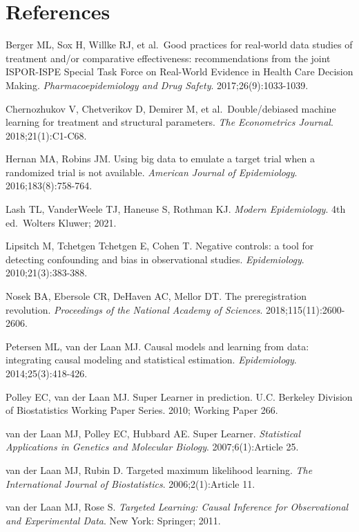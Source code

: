 \documentclass[
  letterpaper,
  DIV=11,
  numbers=noendperiod]{scrartcl}
\newlength{\cslhangindent}
\newenvironment{CSLReferences}[2] %
 {\begin{list}{}{%
  \setlength{\itemindent}{0pt}
  \setlength{\leftmargin}{0pt}
  \setlength{\parsep}{0pt}
  \ifodd #1
   \setlength{\leftmargin}{\cslhangindent}
   \setlength{\itemindent}{-1\cslhangindent}
  \fi
  \setlength{\itemsep}{#2\baselineskip}}}
 {\end{list}}
\begin{document}
\section{References}\label{references}

\label{refs}
\begin{CSLReferences}{0}{1}
\end{CSLReferences}

Berger ML, Sox H, Willke RJ, et al.~Good practices for real-world data
studies of treatment and/or comparative effectiveness: recommendations
from the joint ISPOR-ISPE Special Task Force on Real-World Evidence in
Health Care Decision Making. \emph{Pharmacoepidemiology and Drug
Safety}. 2017;26(9):1033-1039.

Chernozhukov V, Chetverikov D, Demirer M, et al.~Double/debiased machine
learning for treatment and structural parameters. \emph{The Econometrics
Journal}. 2018;21(1):C1-C68.

Hernan MA, Robins JM. Using big data to emulate a target trial when a
randomized trial is not available. \emph{American Journal of
Epidemiology}. 2016;183(8):758-764.

Lash TL, VanderWeele TJ, Haneuse S, Rothman KJ. \emph{Modern
Epidemiology}. 4th ed.~Wolters Kluwer; 2021.

Lipsitch M, Tchetgen Tchetgen E, Cohen T. Negative controls: a tool for
detecting confounding and bias in observational studies.
\emph{Epidemiology}. 2010;21(3):383-388.

Nosek BA, Ebersole CR, DeHaven AC, Mellor DT. The preregistration
revolution. \emph{Proceedings of the National Academy of Sciences}.
2018;115(11):2600-2606.

Petersen ML, van der Laan MJ. Causal models and learning from data:
integrating causal modeling and statistical estimation.
\emph{Epidemiology}. 2014;25(3):418-426.

Polley EC, van der Laan MJ. Super Learner in prediction. U.C. Berkeley
Division of Biostatistics Working Paper Series. 2010; Working Paper 266.

van der Laan MJ, Polley EC, Hubbard AE. Super Learner. \emph{Statistical
Applications in Genetics and Molecular Biology}. 2007;6(1):Article 25.

van der Laan MJ, Rubin D. Targeted maximum likelihood learning.
\emph{The International Journal of Biostatistics}. 2006;2(1):Article 11.

van der Laan MJ, Rose S. \emph{Targeted Learning: Causal Inference for
Observational and Experimental Data}. New York: Springer; 2011.
\end{document}
